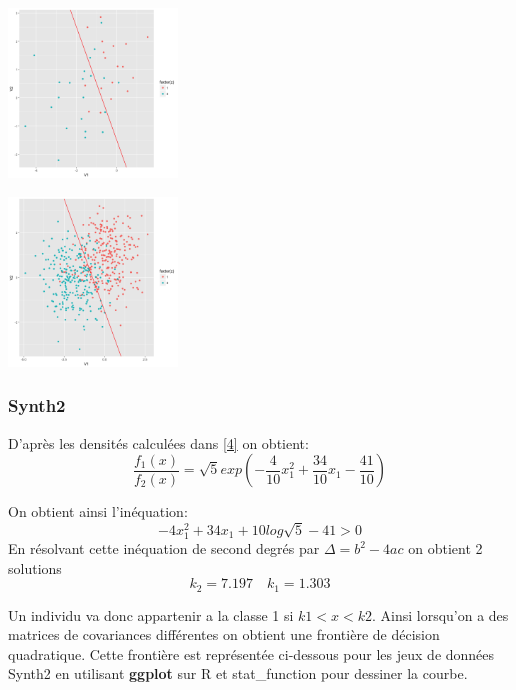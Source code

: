 \documentclass[10pt]{article}
\begin{document}
			\begin{minipage}{.5\textwidth}
	\includegraphics[width=45mm]{Figures/Exo2/linear_synth140.png}
	\label{fig:front_ceuc}
\end{minipage}%
\hspace{0.02\linewidth}
\begin{minipage}{.5\textwidth}
	\includegraphics[width=45mm]{Figures/Exo2/linear_synth1500.png}
	\label{fig:front_kppv}
\end{minipage}

\subsubsection{Synth2}
D'après les densités calculées dans \eqref{4} on obtient: \[\frac{f_{1}(x)}{f_{2}(x)} = \sqrt{5} exp(-\frac{4}{10}x_{1}^{2} + \frac{34}{10} x_{1} - \frac{41}{10})\]

On obtient ainsi l'inéquation: \[-4x_{1}^{2}  + 34x_{1} + 10log\sqrt{5} - 41 > 0\] 
En résolvant cette inéquation de second degrés par $\Delta = b^{2} - 4ac$ on obtient 2 solutions
\[k_{2} = 7.197  \quad k_{1} = 1.303 \]

Un individu va donc appartenir a la classe 1 si $k1<x<k2$. Ainsi lorsqu'on a des matrices de covariances différentes on obtient une frontière de décision quadratique. Cette frontière est représentée  ci-dessous pour les jeux de données Synth2 en utilisant \textbf{ggplot\textit{}} sur R et stat\_function pour dessiner la courbe.\\
\end{document}
